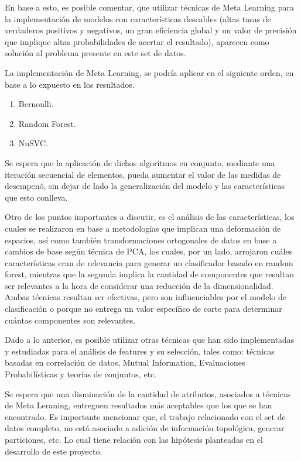 En base a esto, es posible comentar, que utilizar t\'ecnicas de Meta Learning para la implementaci\'on de modelos con caracter\'isticas deseables (altas tasas de verdaderos positivos y negativos, un gran eficiencia global y un valor de precisi\'on que implique altas probabilidades de acertar el resultado), aparecen como soluci\'on al problema presente en este set de datos.

La implementaci\'on de Meta Learning, se podr\'ia aplicar en el siguiente orden, en base a lo expuesto en los resultados.

\begin{enumerate}
	
	\item Bernoulli.
	\item Random Forest.
	\item NuSVC.
	
\end{enumerate}

Se espera que la aplicaci\'on de dichos algoritmos en conjunto, mediante una iteraci\'on secuencial de elementos, pueda aumentar el valor de las medidas de desempen\~o, sin dejar de lado la generalizaci\'on del modelo y las caracter\'isticas que esto conlleva.

Otro de los puntos importantes a discutir, es el an\'alisis de las caracter\'isticas,  los cuales se realizaron en base a metodolog\'ias que implican una deformaci\'on de espacios, as\'i como tambi\'en transformaciones ortogonales de datos en base a cambios de base seg\'un t\'ecnica de PCA, los cuales, por un lado, arrojaron cu\'ales caracter\'isticas eran de relevancia para generar un clasificador basado en random forest, mientras que la segunda implica la cantidad de componentes que resultan ser relevantes a la hora de considerar una reducci\'on de la dimensionalidad. Ambas t\'ecnicas resultan ser efectivas, pero son influenciables por el modelo de clasificaci\'on o porque no entrega un valor espec\'ifico de corte para determinar cu\'antas componentes son relevantes.

Dado a lo anterior, es posible utilizar otras t\'ecnicas que han sido implementadas y estudiadas para el an\'alisis de features y su selecci\'on, tales como: t\'ecnicas basadas en correlaci\'on de datos, Mutual Information, Evaluaciones Probabil\'isticas y teor\'ias de conjuntos, etc.

Se espera que una disminuci\'on de la cantidad de atributos, asociados a t\'ecnicas de Meta Leraning, entreguen resultados m\'as aceptables que los que se han encontrado. Es importante mencionar que, el trabajo relacionado con el set de datos completo, no est\'a asociado a adici\'on de informaci\'on topol\'ogica, generar particiones, etc. Lo cual tiene relaci\'on con las hip\'otesis planteadas en el desarrollo de este proyecto.

